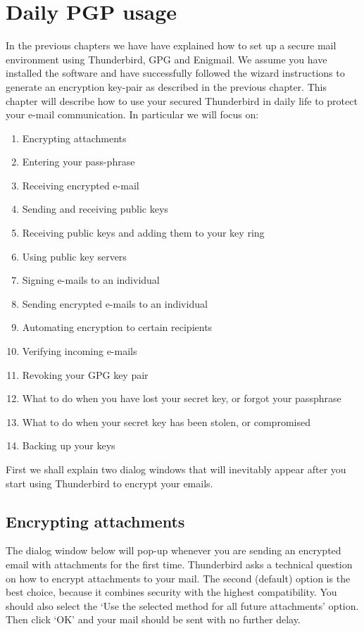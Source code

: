\section{Daily PGP usage}

In the previous chapters we have have explained how to set up a secure
mail environment using Thunderbird, GPG and Enigmail. We assume you have
installed the software and have successfully followed the wizard
instructions to generate an encryption key-pair as described in the
previous chapter. This chapter will describe how to use your secured
Thunderbird in daily life to protect your e-mail communication. In
particular we will focus on:

\begin{enumerate}[1.]
\item
  Encrypting attachments
\item
  Entering your pass-phrase
\item
  Receiving encrypted e-mail
\item
  Sending and receiving public keys
\item
  Receiving public keys and adding them to your key ring
\item
  Using public key servers
\item
  Signing e-mails to an individual
\item
  Sending encrypted e-mails to an individual
\item
  Automating encryption to certain recipients
\item
  Verifying incoming e-mails
\item
  Revoking your GPG key pair
\item
  What to do when you have lost your secret key, or forgot your
  passphrase
\item
  What to do when your secret key has been stolen, or compromised
\item
  Backing up your keys
\end{enumerate}
First we shall explain two dialog windows that will inevitably appear
after you start using Thunderbird to encrypt your emails.

\subsection{Encrypting attachments}

The dialog window below will pop-up whenever you are sending an
encrypted email with attachments for the first time. Thunderbird asks a
technical question on how to encrypt attachments to your mail. The
second (default) option is the best choice, because it combines security
with the highest compatibility. You should also select the `Use the
selected method for all future attachments' option. Then click `OK' and
your mail should be sent with no further delay.

